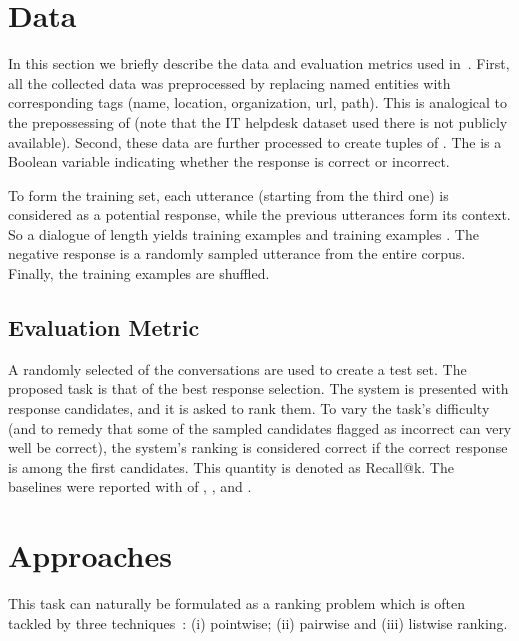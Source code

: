 \documentclass{article} \usepackage{nips15submit_e,times}
\newcommand{\MARTINSECOND}[1]{{\color{black}#1}} \newcommand{\MARTINTHIRD}[1]{{\color{black}#1}} \newcommand{\COPY}[1]{{\color{black}[#1]}}
\begin{document}
\MARTINSECOND
{
\section{Data}
In this section we briefly describe the data and evaluation metrics used in~\cite{lowe2015ubuntu}. 
First, all the collected data was preprocessed by replacing named entities with corresponding
tags (name, location, organization, url, path). This is analogical to the prepossessing of \cite{vinyals2015neural} 
(note that the IT helpdesk dataset used there is not publicly available).
Second, these data are further processed to create tuples of .
The  is a Boolean variable indicating whether the response is correct
or incorrect.

To form the training set, each utterance (starting from the third one) is considered as a
potential response, while the previous utterances form its context.
So a dialogue of length  yields  training examples  and 
 training examples .
The negative response  is a randomly sampled utterance from the entire corpus. 
Finally, the training examples are shuffled.









\subsection{Evaluation Metric}
A randomly selected  of the conversations are used to create a test set.
The proposed task is that of the best response selection.
The system is presented with  response candidates, and it is asked to rank them.
To vary the task's difficulty (and to remedy that some of the sampled candidates flagged as incorrect can very well be correct), 
the system's ranking is considered correct if the correct response is among the first  candidates. This quantity is denoted as Recall@k.
The baselines were reported with  of , ,  and .
}

\section{Approaches}














This task can naturally be formulated as a ranking problem which is often tackled by three techniques~\cite{liu2009learning}: (i) pointwise; (ii) pairwise and (iii) listwise ranking.
\end{document}
